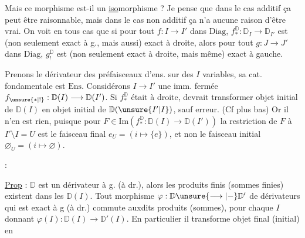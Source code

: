 Mais ce morphisme est-il un \uline{iso}morphisme ? Je pense que dans le cas additif ça peut être raisonnable, mais dans le cas non additif ça n'a aucune raison d'être vrai. On voit en tous cas que si pour tout $f:I\longrightarrow I'$ dans $\mathrm{Diag}$, $f_*^{\mathbb D}:\mathbb D_I\longrightarrow\mathbb D_{I'}$ est (non seulement exact à g., mais aussi) exact à droite, alors pour tout $g:J\longrightarrow J'$ dans $\mathrm{Diag}$, $g_!^{\mathbb D}$ est (non seulement exact à droite, mais même) exact à gauche.

Prenons le dérivateur des préfaisceaux d'ens. sur des $I$ variables, sa cat. fondamentale est $\mathrm{Ens}$.  Considérons $I\longrightarrow I'$ une imm. fermée   $f_{\unsure{*|!}}:\mathbb D(I)\longrightarrow\mathbb D(I')$. Si $f_*^{\mathbb D}$ était  à droite,   devrait transformer objet initial de $\mathbb D(I)$ en objet initial de $\mathbb D(\unsure{I'|I})$, sauf erreur. (Cf plus bas) Or il n'en est rien, puisque pour  $F\in\mathrm{Im}(f_*^{\mathbb D}:\mathbb D(I)\longrightarrow\mathbb D(I'))$ la restriction de $F$ à $I'\setminus I=U$ est le faisceau final $e_U=(i\longmapsto\{e\})$, et non le faisceau initial $\varnothing_U=(i\longmapsto\varnothing)$.

 :

\uline{Prop} :  $\mathbb D$ est un dérivateur à g. (à dr.), alors les produits finis (sommes finies) existent dans les $\mathbb D(I)$. Tout  morphisme  $\varphi:\mathbb D\unsure{\longrightarrow|-}\mathbb D'$ de dérivateurs qui est exact à g (à dr.) commute auxdits produits (sommes),  pour chaque $I$ donnant $\varphi(I):\mathbb D(I)\longrightarrow\mathbb D'(I)$. En particulier il transforme objet final (initial) en 
